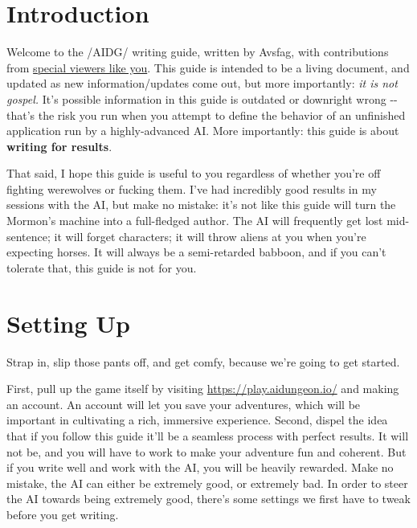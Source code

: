\documentclass[Avsfag-main.tex]{subfiles}
\begin{document}
\chapter{Introduction}

Welcome to the /AIDG/ writing guide, written by Avsfag, with contributions from
\href{https://www.google.com/search?q=Severely+autistic+children\&source=lnms\&tbm=isch\&sa=X\&ved=2ahUKEwjMyu-tpYXrAhWSGs0KHStBDwYQ_AUoAnoECA8QBA\&biw=1792\&bih=948\&dpr=2}{special viewers like you}.
This guide is intended to be a living document, and updated as new information/updates come out, but more importantly: \emph{it is not gospel.}
It's possible information in this guide is outdated or downright wrong -\/- that's the risk you run when you attempt to define the behavior of an unfinished application run by a highly-advanced AI.
More importantly: this guide is about \textbf{writing for results}.

That said, I hope this guide is useful to you regardless of whether you're off fighting werewolves or fucking them.
I've had incredibly good results in my sessions with the AI, but make no mistake: it's not like this guide will turn the Mormon's machine into a full-fledged author.
The AI will frequently get lost mid-sentence; it will forget characters; it will throw aliens at you when you're expecting horses.
It will always be a semi-retarded babboon, and if you can't tolerate that, this guide is not for you.

\chapter{Setting Up}

Strap in, slip those pants off, and get comfy, because we're going to get started.

First, pull up the game itself by visiting
\href{https://play.aidungeon.io/}{https://play.aidungeon.io/} and making an account.
An account will let you save your adventures, which will be important in cultivating a rich, immersive experience.
Second, dispel the idea that if you follow this guide it'll be a seamless process with perfect results.
It will not be, and you will have to work to make your adventure fun and coherent. But if you write well and work with the AI, you will be heavily rewarded.
Make no mistake, the AI can either be extremely good, or extremely bad.
In order to steer the AI towards being extremely good, there's some settings we first have to tweak before you get writing.
\end{document}
